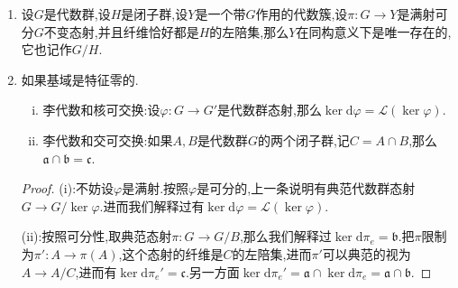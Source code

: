 \begin{enumerate}
\begin{enumerate}[(1)]
\begin{proof}
\begin{itemize}
    			\qquad
    			
    			我们知道不可约代数簇之间的支配态射$\pi:G\to Y$如果满足对任意不可约闭子集$W\subseteq Y$,都有$\pi^{-1}(W)$是等维数$\dim G-\dim Y+\dim W$的,则有$\pi$是开映射.按照$Y$是正则的,它的局部环都是整闭的,进而可以选取$Y$的非空开子集$V\subseteq\pi(G)$,使得只要$W$和$V$有交,如果$Z$是$\pi^{-1}(W)$的和$\pi^{-1}(V)$有交的不可约分支,那么$\dim Z=\dim W+\dim G-\dim Y$.但是这里$G$在$Y$上的作用是可迁的,就有$\{gU\}$覆盖了整个$Y$,于是$\pi^{-1}(W)$的所有分支都有维数$\dim W+\dim G-\dim Y$.
    			\item 结构层.最后还需要验证对任意开子集$U\subseteq X$都有$\psi$诱导了同态$\mathscr{O}_X(U)\to\mathscr{O}_Y(\psi^{-1}(U))$.我们知道$\varphi^*$把$\mathscr{O}_X(U)$映入$\mathscr{O}_G(\varphi^{-1}(U))$,并且像集中的正则函数是在每个左陪集$gH$上是常值映射【?】
    		\end{itemize}
    	\end{proof}
        \item 设$G$是代数群,设$H$是闭子群,设$Y$是一个带$G$作用的代数簇,设$\pi:G\to Y$是满射可分$G$不变态射,并且纤维恰好都是$H$的左陪集,那么$Y$在同构意义下是唯一存在的,它也记作$G/H$.
        \item 如果基域是特征零的.
        \begin{enumerate}[(i)]
        	\item 李代数和核可交换:设$\varphi:G\to G'$是代数群态射,那么$\ker\mathrm{d}\varphi=\mathscr{L}(\ker\varphi)$.
        	\item 李代数和交可交换:如果$A,B$是代数群$G$的两个闭子群,记$C=A\cap B$,那么$\mathfrak{a}\cap\mathfrak{b}=\mathfrak{c}$.
        \end{enumerate}
        \begin{proof}
        	
        	(i):不妨设$\varphi$是满射.按照$\varphi$是可分的,上一条说明有典范代数群态射$G\to G/\ker\varphi$.进而我们解释过有$\ker\mathrm{d}\varphi=\mathscr{L}(\ker\varphi)$.
        	
        	\qquad
        	
        	(ii):按照可分性,取典范态射$\pi:G\to G/B$,那么我们解释过$\ker\mathrm{d}\pi_e=\mathfrak{b}$.把$\pi$限制为$\pi':A\to\pi(A)$,这个态射的纤维是$C$的左陪集,进而$\pi'$可以典范的视为$A\to A/C$,进而有$\ker\mathrm{d}\pi_e'=\mathfrak{c}$.另一方面$\ker\mathrm{d}\pi_e'=\mathfrak{a}\cap\ker\mathrm{d}\pi_e=\mathfrak{a}\cap\mathfrak{b}$.
        \end{proof}
    \end{enumerate}
\end{enumerate}
